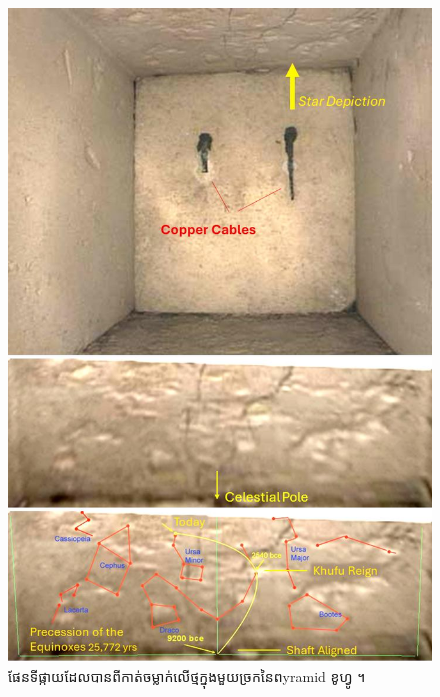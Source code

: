 \documentclass[10pt,twocolumn,letterpaper]{article}
\begin{document}
\begin{figure}[H]
\begin{center}
   \includegraphics[width=1\linewidth]{star-stone.jpg}
\end{center}
   \caption{ផែនទីផ្កាយដែលបានពីកាត់ចម្លាក់លើថ្មក្នុងមួយច្រកនៃពyramid ខូហ្វូ \cite{28}។}
\label{fig:20}
\label{fig:onecol}
\end{figure}
\end{document}
